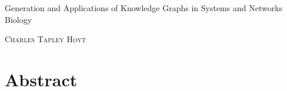 \documentclass[a4paper, openright, 12pt, twoside]{report}
\begin{document}
    \begin{titlepage}                                        %


        \begin{center}


            \fontsize{28}{36}\selectfont                            %

            Generation and Applications of Knowledge Graphs in Systems and Networks Biology

            \vspace{1cm}                                            %
            \renewcommand{\baselinestretch}{1.5}                    %
            \large

            \textsc{Charles Tapley Hoyt} \\

        \end{center}

        {\let\clearpage\relax \chapter*{Abstract}}


        \normalsize \normalfont \renewcommand{\baselinestretch}{1.5} \setlength{\parskip}{1em}

        

    \end{titlepage}
\end{document}
